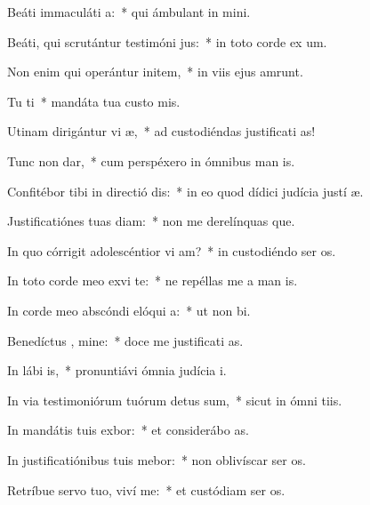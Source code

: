 \item Beáti immaculáti  a:~* qui ámbulant in  mini.
\item Beáti, qui scrutántur testimóni jus:~* in toto corde ex um.
\item Non enim qui operántur initem,~* in viis ejus amrunt.
\item Tu ti~* mandáta tua custo mis.
\item Utinam dirigántur vi æ,~* ad custodiéndas justificati as!
\item Tunc non dar,~* cum perspéxero in ómnibus man is.
\item Confitébor tibi in directió dis:~* in eo quod dídici judícia justí æ.
\item Justificatiónes tuas diam:~* non me derelínquas que.
\item In quo córrigit adolescéntior vi am?~* in custodiéndo ser os.
\item In toto corde meo exvi te:~* ne repéllas me a man is.
\item In corde meo abscóndi elóqui a:~* ut non  bi.
\item Benedíctus , mine:~* doce me justificati as.
\item In lábi is,~* pronuntiávi ómnia judícia  i.
\item In via testimoniórum tuórum detus sum,~* sicut in ómni tiis.
\item In mandátis tuis exbor:~* et considerábo  as.
\item In justificatiónibus tuis mebor:~* non oblivíscar ser os.
\item Retríbue servo tuo, viví me:~* et custódiam ser os.
